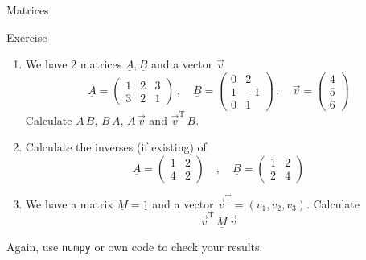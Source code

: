   \begin{frame}{Matrices}
    \begin{exampleblock}{Exercise}
      \begin{enumerate}
        \item We have 2 matrices $\underline{A}, \underline{B}$
          and a vector $\vec{v}$
          \begin{equation*}
            \underline{A} =
              \begin{pmatrix} 1 & 2 & 3 \\ 3 & 2 & 1 \end{pmatrix}
            \,\mathrm{, }\quad
            \underline{B} =
              \begin{pmatrix} 0 & 2 \\ 1 & -1 \\ 0 & 1 \end{pmatrix}
            \,\mathrm{, }\quad
            \vec{v} = \begin{pmatrix} 4 \\ 5 \\ 6 \end{pmatrix}
          \end{equation*}
          Calculate $\underline{A}\,\underline{B}$,
          $\underline{B}\,\underline{A}$,
          $\underline{A}\,\vec{v}$ and $\vec{v}^\mathrm{T}\,\underline{B}$.
        \item Calculate the inverses (if existing) of
          \begin{equation*}
            \underline{A} =
              \begin{pmatrix} 1 & 2 \\ 4 & 2 \end{pmatrix}
            \quad\mathrm{, }\quad
            \underline{B} =
              \begin{pmatrix} 1 & 2 \\ 2 & 4 \end{pmatrix}
          \end{equation*}
        \item We have a matrix $\underline{M} = \underline{1}$
          and a vector $\vec{v}^\mathrm{T} = \left(v_1, v_2, v_3\right)$.
          Calculate
          \begin{equation*}
            \vec{v}^\mathrm{T}\, \underline{M}\, \vec{v}
          \end{equation*}
      \end{enumerate}
    Again, use \texttt{numpy} or own code to check your results.
    \end{exampleblock}
  \end{frame}

